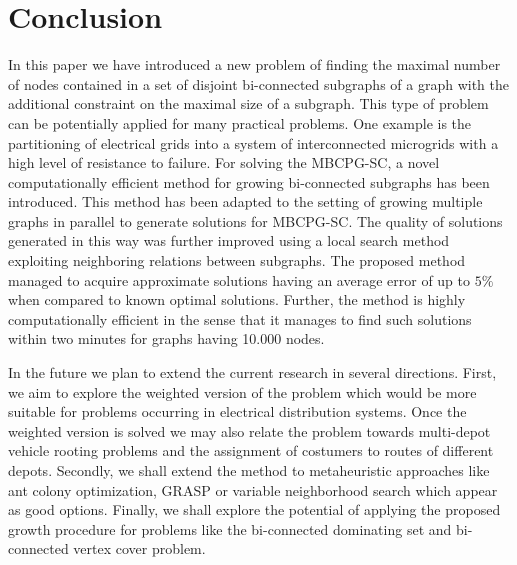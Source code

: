 \section{Conclusion}

In this paper we have introduced a new problem of finding the maximal number of nodes contained in a set of disjoint bi-connected subgraphs of a graph with the additional constraint on the maximal  size of a subgraph. This type of problem can be potentially applied for many practical problems. One example is the partitioning of electrical grids into a system of interconnected microgrids with a high level of resistance to failure. For solving the MBCPG-SC, a novel computationally efficient method for growing bi-connected subgraphs has been introduced. This method has been adapted to the setting of growing multiple graphs in parallel to generate solutions for MBCPG-SC. The quality of solutions generated in this way  was further improved using a local search method exploiting neighboring relations between subgraphs. The proposed method managed to  acquire  approximate solutions having an average error of up to $5\%$ when compared to known optimal solutions.  Further, the method is highly computationally efficient in the sense that it manages to find such solutions within two minutes for graphs having 10.000 nodes.

In the future we plan to extend the current research in several directions. First, we aim to  explore the weighted version of the problem which would be more suitable for problems occurring in electrical distribution systems. Once the weighted version is solved we may also relate the problem towards  multi-depot vehicle rooting problems and the assignment of costumers to routes of different depots. Secondly, we shall extend the method to metaheuristic approaches like ant colony optimization, GRASP or variable neighborhood search which appear  as good options. Finally, we shall explore the potential of applying the proposed growth procedure for problems like the  bi-connected dominating set and bi-connected  vertex cover problem. 




      

